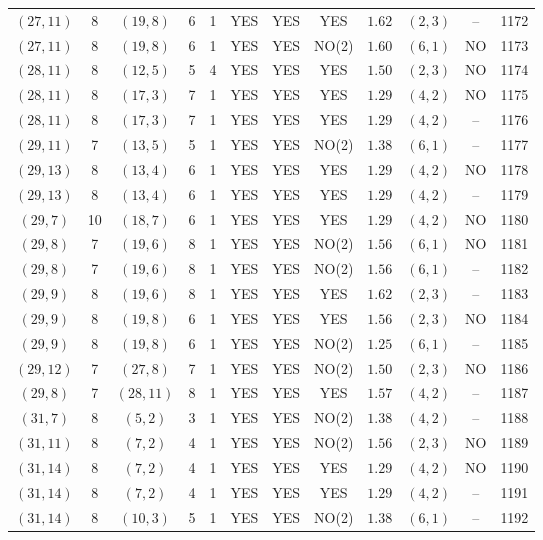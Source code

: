 \begin{longtable}{|c|c|c|c|c|c|c|c|c|c|c|c|}
$(27,11)$ & 8 & $(19,8)$ & 6 & 1 & YES & YES & YES & $1.62$ & $(2,3)$ & -- & 1172\\
$(27,11)$ & 8 & $(19,8)$ & 6 & 1 & YES & YES & NO(2) & $1.60$ & $(6,1)$ & NO & 1173\\
$(28,11)$ & 8 & $(12,5)$ & 5 & 4 & YES & YES & YES & $1.50$ & $(2,3)$ & NO & 1174\\
$(28,11)$ & 8 & $(17,3)$ & 7 & 1 & YES & YES & YES & $1.29$ & $(4,2)$ & NO & 1175\\
$(28,11)$ & 8 & $(17,3)$ & 7 & 1 & YES & YES & YES & $1.29$ & $(4,2)$ & -- & 1176\\
$(29,11)$ & 7 & $(13,5)$ & 5 & 1 & YES & YES & NO(2) & $1.38$ & $(6,1)$ & -- & 1177\\
$(29,13)$ & 8 & $(13,4)$ & 6 & 1 & YES & YES & YES & $1.29$ & $(4,2)$ & NO & 1178\\
$(29,13)$ & 8 & $(13,4)$ & 6 & 1 & YES & YES & YES & $1.29$ & $(4,2)$ & -- & 1179\\
$(29,7)$ & 10 & $(18,7)$ & 6 & 1 & YES & YES & YES & $1.29$ & $(4,2)$ & NO & 1180\\
$(29,8)$ & 7 & $(19,6)$ & 8 & 1 & YES & YES & NO(2) & $1.56$ & $(6,1)$ & NO & 1181\\
$(29,8)$ & 7 & $(19,6)$ & 8 & 1 & YES & YES & NO(2) & $1.56$ & $(6,1)$ & -- & 1182\\
$(29,9)$ & 8 & $(19,6)$ & 8 & 1 & YES & YES & YES & $1.62$ & $(2,3)$ & -- & 1183\\
$(29,9)$ & 8 & $(19,8)$ & 6 & 1 & YES & YES & YES & $1.56$ & $(2,3)$ & NO & 1184\\
$(29,9)$ & 8 & $(19,8)$ & 6 & 1 & YES & YES & NO(2) & $1.25$ & $(6,1)$ & -- & 1185\\
$(29,12)$ & 7 & $(27,8)$ & 7 & 1 & YES & YES & NO(2) & $1.50$ & $(2,3)$ & NO & 1186\\
$(29,8)$ & 7 & $(28,11)$ & 8 & 1 & YES & YES & YES & $1.57$ & $(4,2)$ & -- & 1187\\
$(31,7)$ & 8 & $(5,2)$ & 3 & 1 & YES & YES & NO(2) & $1.38$ & $(4,2)$ & -- & 1188\\
$(31,11)$ & 8 & $(7,2)$ & 4 & 1 & YES & YES & NO(2) & $1.56$ & $(2,3)$ & NO & 1189\\
$(31,14)$ & 8 & $(7,2)$ & 4 & 1 & YES & YES & YES & $1.29$ & $(4,2)$ & NO & 1190\\
$(31,14)$ & 8 & $(7,2)$ & 4 & 1 & YES & YES & YES & $1.29$ & $(4,2)$ & -- & 1191\\
$(31,14)$ & 8 & $(10,3)$ & 5 & 1 & YES & YES & NO(2) & $1.38$ & $(6,1)$ & -- & 1192\\

\end{longtable}
